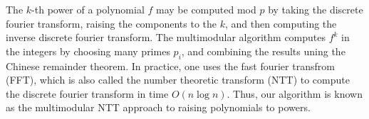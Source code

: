 
%
%
%
%

The \(k\)-th power of a polynomial \(f\) 
may be computed mod \(p\) by taking the discrete fourier
transform, raising the components to the \(k\),
and then computing the inverse discrete fourier transform.
The multimodular algorithm 
computes \(f^{k}\) in the integers by
choosing many primes \(p_{i}\), 
and combining the results uning the Chinese remainder theorem.
In practice, one uses the fast fourier transfrom (FFT),
which is also called the number theoretic transform 
(NTT) to compute the discrete fourier
transform in time \(O(n \log n)\).
Thus, our algorithm is known as the 
multimodular NTT approach to raising polynomials to powers.



